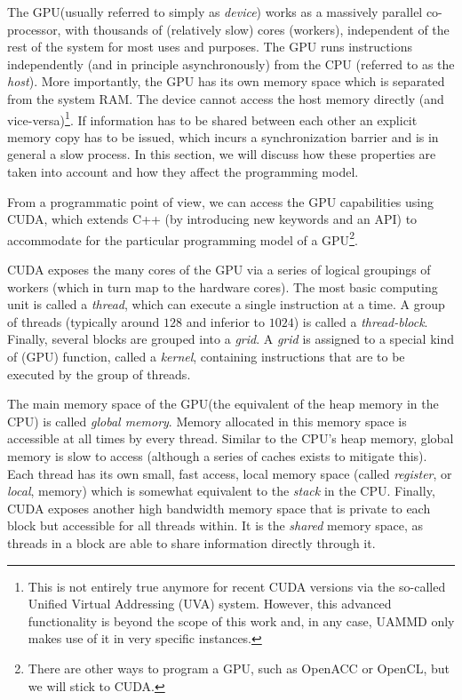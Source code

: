 \documentclass[ twoside,openright,titlepage,numbers=noenddot,%
headinclude,footinclude,cleardoublepage=empty,abstract=on,
BCOR=5mm,paper=b5,fontsize=11pt, dvipsnames
]{scrreprt}
\newcommand{\uammd}{\gls{UAMMD}\xspace}
\newcommand{\gpu}{\gls{GPU}\xspace}
\begin{document}
The \gpu (usually referred to simply as \emph{device}) works as a massively parallel co-processor, with thousands of (relatively slow) cores (workers), independent of the rest of the system for most uses and purposes. The \gpu runs instructions independently (and in principle asynchronously) from the CPU (referred to as the \emph{host}). More importantly, the \gpu has its own memory space which is separated from the system RAM. The device cannot access the host memory directly (and vice-versa)\footnote{This is not entirely true anymore for recent CUDA versions via the so-called Unified Virtual Addressing (UVA) system. However, this advanced functionality is beyond the scope of this work and, in any case, \uammd only makes use of it in very specific instances.}. If information has to be shared between each other an explicit memory copy has to be issued, which incurs a synchronization barrier and is in general a slow process. In this section, we will discuss how these properties are taken into account and how they affect the programming model.

From a programmatic point of view, we can access the \gpu capabilities using CUDA, which extends C++ (by introducing new keywords and an \gls{API}) to accommodate for the particular programming model of a \gpu\footnote{There are other ways to program a \gpu, such as OpenACC\cite{openacc} or OpenCL\cite{Stone2010}, but we will stick to CUDA.}.

CUDA exposes the many cores of the \gpu via a series of logical groupings of workers (which in turn map to the hardware cores). The most basic computing unit is called a \emph{thread}, which can execute a single instruction at a time. A group of threads (typically around $128$ and inferior to $1024$) is called a \emph{thread-block}. Finally, several blocks are grouped into a \emph{grid}. A \emph{grid} is assigned to a special kind of (\gpu) function, called a \emph{kernel}, containing instructions that are to be executed by the group of threads.

The main memory space of the \gpu (the equivalent of the heap memory in the CPU) is called \emph{global memory}. Memory allocated in this memory space is accessible at all times by every thread. 
Similar to the CPU's heap memory, global memory is slow to access (although a series of caches exists to mitigate this).
Each thread has its own small, fast access, local memory space (called \emph{register}, or \emph{local}, memory) which is somewhat equivalent to the \emph{stack} in the CPU.
Finally, CUDA exposes another high bandwidth memory space that is private to each block but accessible for all threads within. It is the \emph{shared} memory space, as threads in a block are able to share information directly through it.
\end{document}

